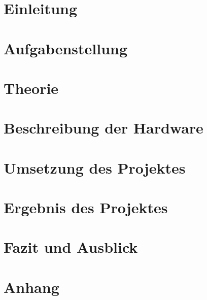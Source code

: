 \documentclass[ngerman]{scrartcl} %
\begin{document}
\tableofcontents
\newpage
 
\section{Einleitung}        
\label{sec:Einleitung-1}   

    

\newpage

\section{Aufgabenstellung}
\label{sec:Aufgabenstellung-1}



\newpage

\section{Theorie}        
\label{sec:Theorie-1}  


 
\section{Beschreibung der Hardware}        
\label{sec:Beschreibung der Hardware-1}  



\section{Umsetzung des Projektes}        
\label{sec:Umsetzung des Projektes-1}  



\section{Ergebnis des Projektes}        
\label{sec:Ergebnis des Projektes-1}  

\newpage

\section{Fazit und Ausblick}        
\label{sec:Fazit und Ausblick-1}  

\newpage

\section{Anhang}        
\label{sec:Anhang-1}  
\end{document}
